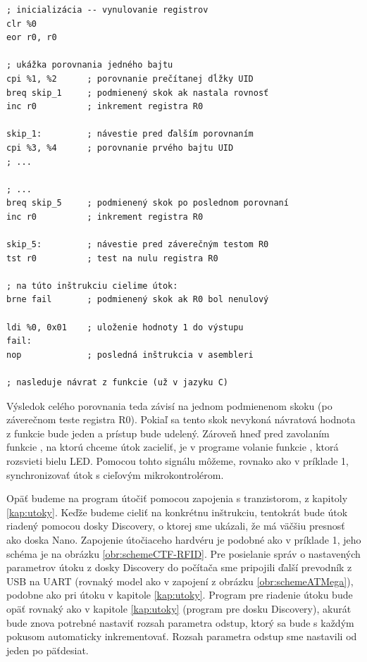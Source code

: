 \begin{lstlisting}[float,language=AVR,caption={Ukážky kódu v asembleri z funkcie \uv{checkAccess} z príkladu 2. \%0 označuje výstupný parameter -- register s návratovou hodnotou, \%1, \%3 registre s prečítanými hodnotami a \%2, \%4 staticky delkarované konštanty.},label=alg:asmCTF2]
; inicializácia -- vynulovanie registrov
clr %0
eor r0, r0

; ukážka porovnania jedného bajtu
cpi %1, %2      ; porovnanie prečítanej dĺžky UID
breq skip_1     ; podmienený skok ak nastala rovnosť
inc r0          ; inkrement registra R0

skip_1:         ; návestie pred ďalším porovnaním
cpi %3, %4      ; porovnanie prvého bajtu UID
; ...

; ...
breq skip_5     ; podmienený skok po poslednom porovnaní
inc r0          ; inkrement registra R0

skip_5:         ; návestie pred záverečným testom R0
tst r0          ; test na nulu registra R0

; na túto inštrukciu cielime útok:
brne fail       ; podmienený skok ak R0 bol nenulový

ldi %0, 0x01    ; uloženie hodnoty 1 do výstupu
fail:
nop             ; posledná inštrukcia v asembleri

; nasleduje návrat z funkcie (už v jazyku C)
\end{lstlisting}

Výsledok celého porovnania teda závisí na jednom podmienenom skoku (po záverečnom teste registra R0). Pokiaľ sa tento skok nevykoná návratová hodnota z funkcie bude jeden a prístup bude udelený. Zároveň hneď pred zavolaním funkcie , na ktorú chceme útok zacieliť, je v programe volanie funkcie , ktorá rozsvieti bielu LED. Pomocou tohto signálu môžeme, rovnako ako v príklade 1, synchronizovať útok s cieľovým mikrokontrolérom.

Opäť budeme na program útočiť pomocou zapojenia s tranzistorom, z kapitoly \ref{kap:utoky}. Keďže budeme cieliť na konkrétnu inštrukciu, tentokrát bude útok riadený pomocou dosky Discovery, o ktorej sme ukázali, že má väčšiu presnosť ako doska Nano. Zapojenie útočiaceho hardvéru je podobné ako v príklade 1, jeho schéma je na obrázku \ref{obr:schemeCTF-RFID}. Pre posielanie správ o nastavených parametrov útoku z dosky Discovery do počítača sme pripojili ďalší prevodník z USB na UART (rovnaký model ako v zapojení z obrázku \ref{obr:schemeATMega}), podobne ako pri útoku v kapitole \ref{kap:utoky}. Program pre riadenie útoku bude opäť rovnaký ako v kapitole \ref{kap:utoky} (program pre dosku Discovery), akurát bude znova potrebné nastaviť rozsah parametra odstup, ktorý sa bude s každým pokusom automaticky inkrementovať. Rozsah parametra odstup sme nastavili od jeden po päťdesiat.

